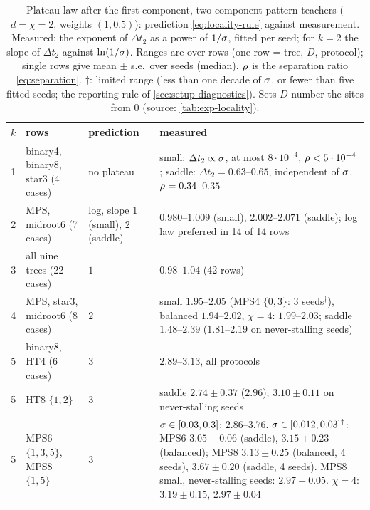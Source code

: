 \begin{table}[tbp]
  \centering
  \caption{Plateau law after the first component, two-component pattern teachers ($d=\chi=2$, weights
    $(1,0.5)$): prediction \eqref{eq:locality-rule} against measurement. Measured: the exponent of
    $\Delta t_2$ as a power of $1/\sigma$, fitted per seed; for $k=2$ the slope of $\Delta t_2$ against $\ln(1/\sigma)$.
    Ranges are over rows (one row = tree, $D$, protocol); single rows give mean $\pm$ s.e.\ over seeds (median).
    $\rho_{}$ is the separation ratio \eqref{eq:separation}. $\dagger$: limited range (less than one decade of
    $\sigma$, or fewer than five fitted seeds; the reporting rule of \cref{sec:setup-diagnostics}). Sets $D$ number
    the sites from $0$ (source: \cref{tab:exp-locality}).}
  \label{tab:locality-exponents}
  \small
  \begin{tabularx}{\textwidth}{@{}c>{\raggedright\arraybackslash}p{3.0cm}
      >{\raggedright\arraybackslash}p{1.9cm}>{\raggedright\arraybackslash}X@{}}
    \toprule
    $k$ & rows & prediction & measured \\
    \midrule
    1 & binary4, binary8, star3 (4 cases) & no plateau & small: $\Delta t_2\propto\sigma$, at most
      $8\cdot10^{-4}$, $\rho_{}<5\cdot10^{-4}$; saddle: $\Delta t_2=0.63$--$0.65$, independent of $\sigma$, $\rho_{}=0.34$--$0.35$ \\
    2 & MPS, midroot6 (7 cases) & log, slope $1$ (small), $2$ (saddle) & $0.980$--$1.009$ (small),
      $2.002$--$2.071$ (saddle); log law preferred in 14 of 14 rows \\
    3 & all nine trees (22 cases) & $1$ & $0.98$--$1.04$ (42 rows) \\
    4 & MPS, star3, midroot6 (8 cases) & $2$ & small $1.95$--$2.05$ (MPS4 $\{0,3\}$: 3 seeds$^\dagger$), balanced
      $1.94$--$2.02$, $\chi=4$: $1.99$--$2.03$; saddle $1.48$--$2.39$ ($1.81$--$2.19$ on never-stalling seeds) \\
    5 & binary8, HT4 (6 cases) & $3$ & $2.89$--$3.13$, all protocols \\
    5 & HT8 $\{1,2\}$ & $3$ & saddle $2.74\pm0.37$ ($2.96$); $3.10\pm0.11$ on never-stalling seeds \\
    5 & MPS6 $\{1,3,5\}$, MPS8 $\{1,5\}$ & $3$ & $\sigma\in[0.03,0.3]$: $2.86$--$3.76$.
      $\sigma\in[0.012,0.03]^\dagger$: MPS6 $3.05\pm0.06$ (saddle), $3.15\pm0.23$ (balanced); MPS8
      $3.13\pm0.25$ (balanced, 4 seeds), $\mathbf{3.67\pm0.20}$ (saddle, 4 seeds). MPS8 small, never-stalling
      seeds: $2.97\pm0.05$. $\chi=4$: $3.19\pm0.15$, $2.97\pm0.04$ \\

\end{tabularx}
\end{table}
